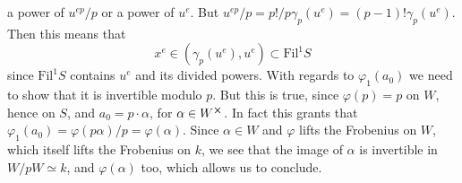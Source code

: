 \begin{rem}[]
	a power of $u^{ep}/p$ or a power of $u^e$.
	But $u^{ep}/p = p!/p \gamma_p(u^e) = (p-1)! \gamma_p(u^e)$.
	Then this means that
	\begin{equation*}
		x^e \in \left( \gamma_p(u^e), u^e \right) \subset \mathrm{Fil}^1S
	\end{equation*}
	since $\mathrm{Fil}^1S$ contains $u^e$ and its divided powers.
	With regards to $\varphi_1(a_0)$ we need to show that it 
	is invertible modulo $p$.
	But this is true, since $\varphi(p) = p$ on $W$, hence on $S$,
	and $a_0 = p \cdot \alpha$, for $\alpha \in W^{\cross}$.
	In fact this grants that $\varphi_1(a_0) = \varphi(p \alpha)/p = \varphi(\alpha)$.
	Since $\alpha \in W$ and $\varphi$ lifts the Frobenius on $W$,
	which itself lifts the Frobenius on $k$, we see that the image
	of $\alpha$ is invertible in $W/pW \simeq k$, and $\varphi(\alpha)$ too,
	which allows us to conclude.
\end{rem}


